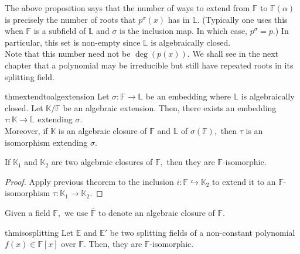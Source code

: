 \begin{rem}
    The above proposition says that the number of ways to extend from $\mathbb{F}$ to $\mathbb{F}(\alpha)$ is precisely the number of roots that $p^{\sigma}(x)$ has in $\mathbb{L}.$ (Typically one uses this when $\mathbb{F}$ is a subfield of $\mathbb{L}$ and $\sigma$ is the inclusion map. In which case, $p^{\sigma} = p$.) In particular, this set is non-empty since $\mathbb{L}$ is algebraically closed. \\
    Note that this number need not be $\deg(p(x)).$ We shall see in the next chapter that a polynomial may be irreducible but still have repeated roots in its splitting field.
\end{rem}

\begin{restatable}[]{thm}{extendtoalgextension}
\label{thm:extendtoalgextension}
    Let $\sigma : \mathbb{F} \to \mathbb{L}$ be an embedding where $\mathbb{L}$ is algebraically closed. Let $\mathbb{K}/\mathbb{F}$ be an algebraic extension. Then, there exists an embedding $\tau : \mathbb{K} \to \mathbb{L}$ extending $\sigma.$ \\
    Moreover, if $\mathbb{K}$ is an algebraic closure of $\mathbb{F}$ and $\mathbb{L}$ of $\sigma(\mathbb{F}),$ then $\tau$ is an isomorphism extending $\sigma.$ \hfill\hyperref[thm:extendtoalgextension2]{\downsym}
\end{restatable}

\begin{cor}
    If $\mathbb{K}_1$ and $\mathbb{K}_2$ are two algebraic closures of $\mathbb{F},$ then they are $\mathbb{F}$-isomorphic.
\end{cor}
\begin{proof} 
    Apply previous theorem to the inclusion $i : \mathbb{F} \hookrightarrow \mathbb{K}_2$ to extend it to an $\mathbb{F}$-isomorphism $\tau : \mathbb{K}_1 \to \mathbb{K}_2.$
\end{proof}

\begin{defn}%
    Given a field $\mathbb{F},$ we use $\overline{\mathbb{F}}$ to denote an algebraic closure of $\mathbb{F}.$ 
\end{defn}

\begin{restatable}{thm}{isosplitting}
\label{thm:isosplitting}
    Let $\mathbb{E}$ and $\mathbb{E}'$ be two splitting fields of a non-constant polynomial $f(x) \in \mathbb{F}[x]$ over $\mathbb{F}.$ Then, they are $\mathbb{F}$-isomorphic. \hfill\hyperref[thm:isosplitting2]{\downsym}
\end{restatable}